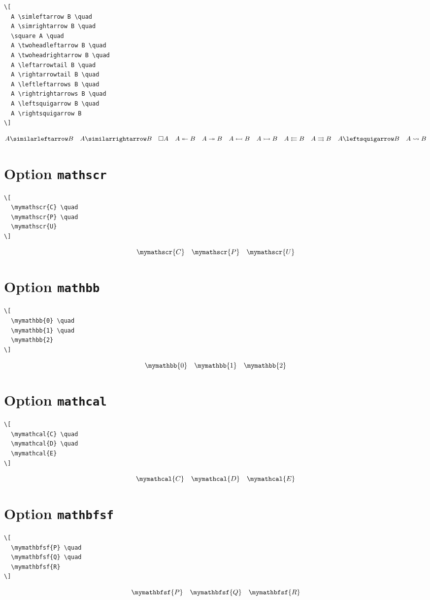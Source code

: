 \documentclass{article}
\begin{document}
\begin{verbatim}
\[
  A \simleftarrow B \quad
  A \simrightarrow B \quad
  \square A \quad
  A \twoheadleftarrow B \quad
  A \twoheadrightarrow B \quad
  A \leftarrowtail B \quad
  A \rightarrowtail B \quad
  A \leftleftarrows B \quad
  A \rightrightarrows B \quad
  A \leftsquigarrow B \quad
  A \rightsquigarrow B
\]
\end{verbatim}
%
\[
  A \simleftarrow B \quad
  A \simrightarrow B \quad
  \square A \quad
  A \twoheadleftarrow B \quad
  A \twoheadrightarrow B \quad
  A \leftarrowtail B \quad
  A \rightarrowtail B \quad
  A \leftleftarrows B \quad
  A \rightrightarrows B \quad
  A \leftsquigarrow B \quad
  A \rightsquigarrow B
\]

\section{Option \texttt{mathscr}}

\begin{verbatim}
\[
  \mymathscr{C} \quad
  \mymathscr{P} \quad
  \mymathscr{U}
\]
\end{verbatim}
%
\[
  \mymathscr{C} \quad
  \mymathscr{P} \quad
  \mymathscr{U}
\]

\section{Option \texttt{mathbb}}

\begin{verbatim}
\[
  \mymathbb{0} \quad
  \mymathbb{1} \quad
  \mymathbb{2}
\]
\end{verbatim}
%
\[
  \mymathbb{0} \quad
  \mymathbb{1} \quad
  \mymathbb{2}
\]

\section{Option \texttt{mathcal}}

\begin{verbatim}
\[
  \mymathcal{C} \quad
  \mymathcal{D} \quad
  \mymathcal{E}
\]
\end{verbatim}
%
\[
  \mymathcal{C} \quad
  \mymathcal{D} \quad
  \mymathcal{E}
\]

\section{Option \texttt{mathbfsf}}

\begin{verbatim}
\[
  \mymathbfsf{P} \quad
  \mymathbfsf{Q} \quad
  \mymathbfsf{R}
\]
\end{verbatim}
%
\[
  \mymathbfsf{P} \quad
  \mymathbfsf{Q} \quad
  \mymathbfsf{R}
\]
\end{document}
